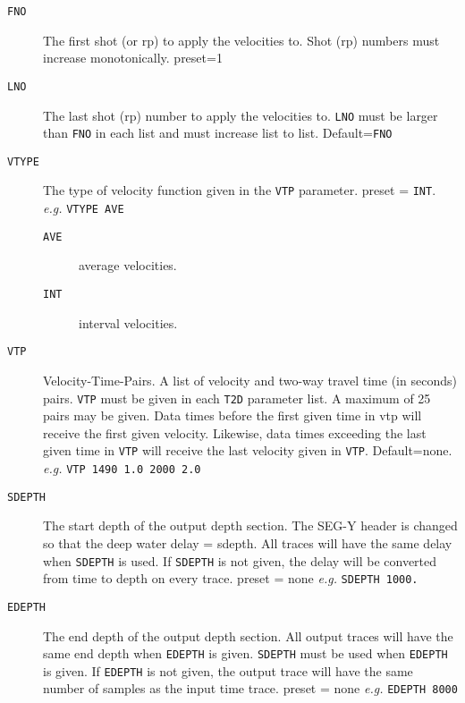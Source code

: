 \begin{description}
\item[\texttt{FNO}] The first \gls{shot} (or \gls{rp}) to apply the velocities to.  Shot (\gls{rp})
         numbers must increase monotonically.
         \Gls{preset}=1

\item[\texttt{LNO}] The last \gls{shot} (\gls{rp}) number to apply the velocities to.  \texttt{LNO} must
         be larger than \texttt{FNO} in each list and must increase list to list.
         Default=\texttt{FNO}
\item[\texttt{VTYPE}] The type of velocity function given in the \texttt{VTP} parameter.
         \Gls{preset} = \texttt{INT}.  \textit{e.g.}  \texttt{VTYPE AVE}
\begin{description}
\item[\texttt{AVE}]  average velocities.
\item[\texttt{INT}]  interval velocities.
\end{description}

\item[\texttt{VTP}] Velocity-Time-Pairs.  A list of velocity and two-way travel time
         (in seconds) pairs.  \texttt{VTP} must be given in each \texttt{T2D} parameter
         list.  A maximum of 25 pairs may be given.  Data times before
         the first given time in vtp will receive the first given
         velocity.  Likewise, data times exceeding the last given time in
         \texttt{VTP} will receive the last velocity given in \texttt{VTP}.
         Default=none. \textit{e.g.}  \texttt{VTP 1490 1.0 2000 2.0}

\item[\texttt{SDEPTH}] The start depth of the output depth section.  The SEG-Y header
         is changed so that the deep water delay = sdepth.  All traces will
         have the same delay when \texttt{SDEPTH} is used.  If \texttt{SDEPTH} is not given,
         the delay will be converted from time to depth on every trace.
         \Gls{preset} = none    \textit{e.g.}  \texttt{SDEPTH 1000.}

\item[\texttt{EDEPTH}] The end depth of the output depth section.  All output traces
         will have the same end depth when \texttt{EDEPTH} is given.  \texttt{SDEPTH} must
         be used when \texttt{EDEPTH} is given.  If \texttt{EDEPTH} is not given, the output
         trace will have the same number of samples as the input time trace.
         \Gls{preset} = none     \textit{e.g.}  \texttt{EDEPTH 8000}


\end{description}
